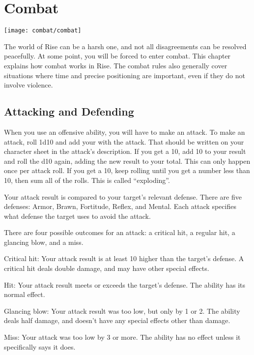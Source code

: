 \chapter{Combat}\label{Combat}
\texttt{[image: combat/combat]}

The world of Rise can be a harsh one, and not all disagreements can be resolved peacefully.
At some point, you will be forced to enter combat.
This chapter explains how combat works in Rise.
The combat rules also generally cover situations where time and precise positioning are important, even if they do not involve violence.

\section{Attacking and Defending}
  When you use an offensive ability, you will have to make an attack.
  To make an attack, roll 1d10 and add your  with the attack.
  That should be written on your character sheet in the attack's description.
  If you get a 10, add 10 to your result and roll the d10 again, adding the new result to your total. This can only happen once per attack roll.
  If you get a 10, keep rolling until you get a number less than 10, then sum all of the rolls.
  This is called ``exploding''.

  Your attack result is compared to your target's relevant defense.
  There are five defenses: Armor, Brawn, Fortitude, Reflex, and Mental.
  Each attack specifies what defense the target uses to avoid the attack.

  There are four possible outcomes for an attack: a critical hit, a regular hit, a glancing blow, and a miss.
  \begin{raggeditemize}
    \item Critical hit: Your attack result is at least 10 higher than the target's defense.
      A critical hit deals double damage, and may have other special effects.
    \item Hit: Your attack result meets or exceeds the target's defense.
      The ability has its normal effect.
    \item Glancing blow: Your attack result was too low, but only by 1 or 2.
      The ability deals half damage, and doesn't have any special effects other than damage.
    \item Miss: Your attack was too low by 3 or more.
      The ability has no effect unless it specifically says it does.
  \end{raggeditemize}

